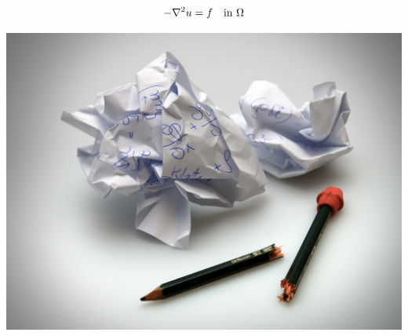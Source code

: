 \documentclass[%
oneside,                 %
final,                   %
chapterprefix=true,      %
open=right               %
10pt]{book}
\begin{document}
\noindent

\[ -\nabla^2 u = f \quad\hbox{in }\Omega \]



\begin{center}  %
  \centerline{\includegraphics[width=0.9\linewidth]{../doc/slides/fig/broken_pen_and_paper.jpg}}
\end{center}




\printindex
\end{document}
